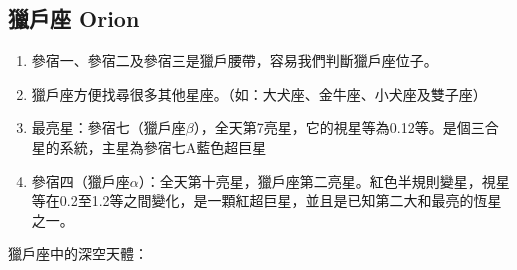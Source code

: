 \subsection{獵戶座 Orion}
\begin{enumerate}
    \item 參宿一、參宿二及參宿三是獵戶腰帶，容易我們判斷獵戶座位子。
    \item 獵戶座方便找尋很多其他星座。（如：大犬座、金牛座、小犬座及雙子座）
    \item 最亮星：參宿七（獵戶座\(\beta\)），全天第7亮星，它的視星等為0.12等。是個三合星的系統，主星為參宿七A藍色超巨星
    \item 參宿四（獵戶座\(\alpha\)）：全天第十亮星，獵戶座第二亮星。紅色半規則變星，視星等在0.2至1.2等之間變化，是一顆紅超巨星，並且是已知第二大和最亮的恆星之一。
\end{enumerate}
獵戶座中的深空天體：

